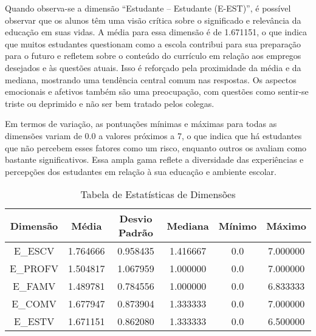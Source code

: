 Quando observa-se a dimensão ``Estudante – Estudante (E-EST)'', é possível observar que os alunos têm uma visão crítica sobre o significado e relevância da educação em suas vidas. A média para essa dimensão é de 1.671151, o que indica que muitos estudantes questionam como a escola contribui para sua preparação para o futuro e refletem sobre o conteúdo do currículo em relação aos empregos desejados e às questões atuais. Isso é reforçado pela proximidade da média e da mediana, mostrando uma tendência central comum nas respostas. Os aspectos emocionais e afetivos também são uma preocupação, com questões como sentir-se triste ou deprimido e não ser bem tratado pelos colegas. %

Em termos de variação, as pontuações mínimas e máximas para todas as dimensões variam de 0.0 a valores próximos a 7, o que indica que há estudantes que não percebem esses fatores como um risco, enquanto outros os avaliam como bastante significativos. Essa ampla gama reflete a diversidade das experiências e percepções dos estudantes em relação à sua educação e ambiente escolar.


\begin{table}[ht]
    \centering
    \caption{Tabela de Estatísticas de Dimensões}
    \label{tab:estatisticas}
    \begin{tabular}{|c|c|c|c|c|c|}
        \hline
        \textbf{Dimensão} & \textbf{Média} & \textbf{Desvio Padrão} & \textbf{Mediana} & \textbf{Mínimo} & \textbf{Máximo} \\
        \hline
        E\_ESCV & 1.764666 & 0.958435 & 1.416667 & 0.0 & 7.000000 \\
        E\_PROFV & 1.504817 & 1.067959 & 1.000000 & 0.0 & 7.000000 \\
        E\_FAMV & 1.489781 & 0.784556 & 1.000000 & 0.0 & 6.833333 \\
        E\_COMV & 1.677947 & 0.873904 & 1.333333 & 0.0 & 7.000000 \\
        E\_ESTV & 1.671151 & 0.862080 & 1.333333 & 0.0 & 6.500000 \\
        \hline
    \end{tabular}
\end{table}

